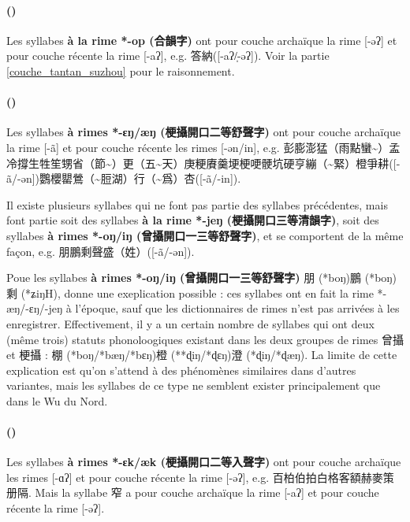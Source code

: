 \documentclass{scrbook}
\newcounter{c}[subsubsection]
\newcommand{\stpc}[1]{\stepcounter{#1}}
\newcommand{\bolang}{\textasciitilde}
\newcommand{\termyyx}[1]{\textbf{#1}}
\begin{document}
\begin{sloppypar}
\stpc{c}\paragraph{()}
Les syllabes \termyyx{à la rime *-op (合韻字)} ont pour couche archaïque la rime [-əʔ] et pour couche récente la rime [-aʔ], e.g. 答納([-aʔ/̩-əʔ]). Voir la partie \ref{couche_tantan_suzhou} pour le raisonnement.

\stpc{c}\paragraph{()}
Les syllabes \termyyx{à rimes *-ɛŋ/æŋ (梗攝開口二等舒聲字)} ont pour couche archaïque la rime [-ã] et pour couche récente les rimes [-ən/in], e.g. 彭膨澎猛（雨點蠻\bolang ）孟冷撐生牲笙甥省（節\bolang ）更（五\bolang 天）庚粳賡羹埂梗哽骾坑硬亨繃（\bolang 緊）橙爭耕([-ã/-ən])鸚櫻罌鶯（\bolang 脰湖）行（\bolang 爲）杏([-ã/-in]). 

Il existe plusieurs syllabes qui ne font pas partie des syllabes précédentes, mais font partie soit des syllabes \termyyx{à la rime *-jeŋ (梗攝開口三等清韻字)}, soit des syllabes \termyyx{à rimes *-oŋ/iŋ (曾攝開口一三等舒聲字)}, et se comportent de la même façon, e.g. 朋鵬剩聲盛（姓）([-ã/-ən]).

Poue les syllabes \termyyx{à rimes *-oŋ/iŋ (曾攝開口一三等舒聲字)} 朋 (*boŋ)鵬 (*boŋ)剩 (*ʑiŋH), \textcite[76]{Zheng2010zeng_geng_taihu_wu} donne une exeplication possible : ces syllabes ont en fait la rime *-æŋ/-ɛŋ/-jeŋ à l'époque, sauf que les dictionnaires de rimes n'est pas arrivées à les enregistrer. Effectivement, il y a un certain nombre de syllabes qui ont deux (même trois) statuts phonoloogiques existant dans les deux groupes de rimes 曾攝 et 梗攝 : 棚 (*boŋ/*bæŋ/*bɛŋ)橙 (**ɖiŋ/*ɖɛŋ)澄 (*ɖiŋ/*ɖæŋ). La limite de cette explication est qu'on s'attend à des phénomènes similaires dans d'autres variantes, mais les syllabes de ce type ne semblent exister principalement que dans le Wu du Nord.

\stpc{c}\paragraph{()}
Les syllabes \termyyx{à rimes *-ɛk/æk (梗攝開口二等入聲字)} ont pour couche archaïque les rimes [-ɑʔ] et pour couche récente la rime [-əʔ], e.g. 百柏伯拍白格客額赫麥策册隔. Mais la syllabe 窄 a pour couche archaïque la rime [-aʔ] et pour couche récente la rime [-əʔ]. 


\end{sloppypar}
\end{document}
